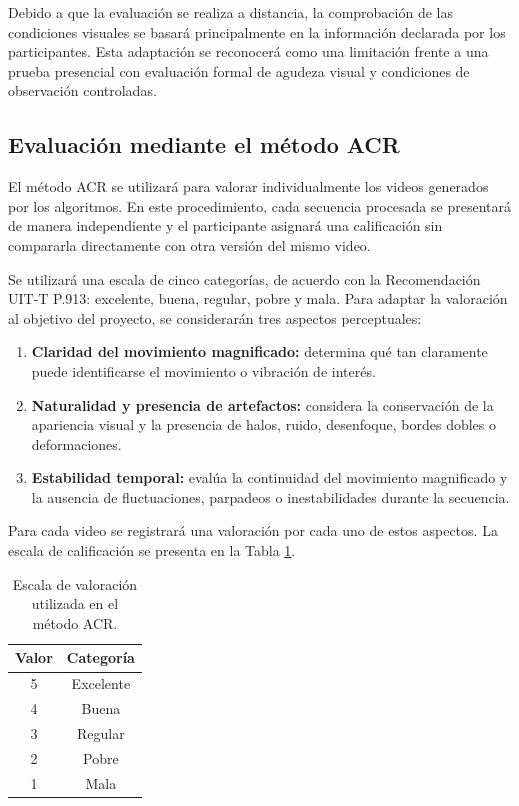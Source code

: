 Debido a que la evaluación se realiza a distancia, la comprobación de las condiciones visuales se basará principalmente en la información declarada por los participantes. Esta adaptación se reconocerá como una limitación frente a una prueba presencial con evaluación formal de agudeza visual y condiciones de observación controladas.

\subsection{Evaluación mediante el método ACR}

El método \gls{ACR} se utilizará para valorar individualmente los videos generados por los algoritmos. En este procedimiento, cada secuencia procesada se presentará de manera independiente y el participante asignará una calificación sin compararla directamente con otra versión del mismo video.

Se utilizará una escala de cinco categorías, de acuerdo con la Recomendación UIT-T P.913: excelente, buena, regular, pobre y mala. Para adaptar la valoración al objetivo del proyecto, se considerarán tres aspectos perceptuales:

\begin{enumerate}
\item \textbf{Claridad del movimiento magnificado:} determina qué tan claramente puede identificarse el movimiento o vibración de interés.

\item \textbf{Naturalidad y presencia de artefactos:} considera la conservación de la apariencia visual y la presencia de halos, ruido, desenfoque, bordes dobles o deformaciones.

\item \textbf{Estabilidad temporal:} evalúa la continuidad del movimiento magnificado y la ausencia de fluctuaciones, parpadeos o inestabilidades durante la secuencia.

\end{enumerate}

Para cada video se registrará una valoración por cada uno de estos aspectos. La escala de calificación se presenta en la Tabla \ref{tab:escala_acr}.

\begin{table}[H]
\centering
\caption{Escala de valoración utilizada en el método ACR.}
\label{tab:escala_acr}
\begin{tabular}{|c|c|}
\hline
\textbf{Valor} & \textbf{Categoría} \\ \hline
5 & Excelente \\ \hline
4 & Buena \\ \hline
3 & Regular \\ \hline
2 & Pobre \\  \hline
1 & Mala \\ \hline
\end{tabular}
\end{table}

